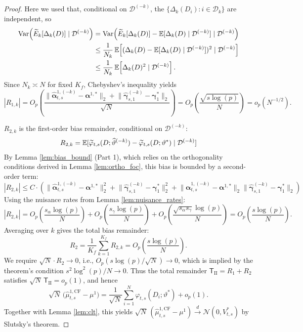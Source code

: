 \documentclass{article}
\begin{document}
\begin{proof}
Here we used that, conditional on $\mathcal{D}^{(-k)}$, the $\{\Delta_k(D_i): i\in\mathcal{D}_k\}$ are independent, so
\[
\begin{aligned}
\operatorname{Var}\!\left(\widetilde{E}_k[\Delta_k(D)]\mid\mathcal{D}^{(-k)}\right)
&=
\operatorname{Var}\!\left(\widetilde{E}_k[\Delta_k(D)]-\operatorname{\mathbb{E}}[\Delta_k(D)\mid\mathcal{D}^{(-k)}]\mid\mathcal{D}^{(-k)}\right) \\
&\le
\frac{1}{N_k}\operatorname{\mathbb{E}}\!\left[(\Delta_k(D)-\operatorname{\mathbb{E}}[\Delta_k(D)\mid\mathcal{D}^{(-k)}])^2\mid\mathcal{D}^{(-k)}\right] \\
&\le
\frac{1}{N_k}\operatorname{\mathbb{E}}\!\left[\Delta_k(D)^2\mid\mathcal{D}^{(-k)}\right].
\end{aligned}
\]
Since $N_k\asymp N$ for fixed $K_f$, Chebyshev's inequality yields
\[
|R_{1,k}| = O_p\!\left(\frac{
\|\widehat{\boldsymbol{\alpha}}_{t,s}^{1,(-k)}-\boldsymbol{\alpha}^{1,*}\|_2
\!+\!
\|\widehat{\boldsymbol{\gamma}}_{s,1}^{(-k)}-\boldsymbol{\gamma}_{1}^{*}\|_2
}{\sqrt{N}}\right)
= O_p\!\left(\frac{\sqrt{s\log(p)}}{N}\right)
= o_p(N^{-1/2}).
\]

$R_{2,k}$ is the first-order bias remainder, conditional on $\mathcal{D}^{(-k)}$:
\[
R_{2,k} = \operatorname{\mathbb{E}}[\widetilde{\varphi}_{t,s}(D; \widehat{\vartheta}^{(-k)}) - \widetilde{\varphi}_{t,s}(D; \vartheta^*) \mid \mathcal{D}^{(-k)}]
\]
By Lemma \ref{lem:bias_bound} (Part 1), which relies on the orthogonality conditions derived in Lemma \ref{lem:ortho_foc}, this bias is bounded by a second-order term:
\[
|R_{2,k}| \le C \cdot \left(
\lVert \widehat{\boldsymbol{\alpha}}_{t,s}^{1,(-k)} - \boldsymbol{\alpha}^{1,*} \rVert_2^2
+
\lVert \widehat{\boldsymbol{\gamma}}_{s,1}^{(-k)} - \boldsymbol{\gamma}_1^* \rVert_2^2
+
\lVert \widehat{\boldsymbol{\alpha}}_{t,s}^{1,(-k)} - \boldsymbol{\alpha}^{1,*} \rVert_2
\lVert \widehat{\boldsymbol{\gamma}}_{s,1}^{(-k)} - \boldsymbol{\gamma}_1^* \rVert_2
\right)
\]
Using the nuisance rates from Lemma \ref{lem:nuisance_rates}:
\[
|R_{2,k}| = O_p\left(\frac{s_\alpha \log(p)}{N}\right) + O_p\left(\frac{s_\gamma \log(p)}{N}\right) + O_p\left( \frac{\sqrt{s_\alpha s_\gamma} \log(p)}{N} \right)
= O_p\left( \frac{s \log(p)}{N} \right).
\]
Averaging over $k$ gives the total bias remainder:
\[
R_2 = \frac{1}{K_f}\sum_{k=1}^{K_f} R_{2,k} = O_p\!\left( \frac{s \log(p)}{N} \right).
\]
We require $\sqrt{N}\cdot R_2 \to 0$, i.e., $O_p(s \log(p) / \sqrt{N}) \to 0$, which is implied by the theorem's condition $s^2 \log^2(p)/N \to 0$.
Thus the total remainder $\mathsf{T}_{\mathrm{II}}=R_1+R_2$ satisfies $\sqrt{N}\,\mathsf{T}_{\mathrm{II}}=o_p(1)$, and hence
\[
\sqrt{N}\,\big(\widehat{\mu}^{1,\mathrm{CF}}_{t,s} - \mu^1\big)
=
\frac{1}{\sqrt{N}}\sum_{i=1}^{N}\varphi_{t,s}(D_i;\vartheta^*) + o_p(1).
\]
Together with Lemma \ref{lem:clt}, this yields $\sqrt{N}\,(\widehat{\mu}^{1,\mathrm{CF}}_{t,s} - \mu^1)\xrightarrow{d}\mathcal{N}(0,V^*_{t,s})$ by Slutsky's theorem.
\end{proof}
\end{document}
